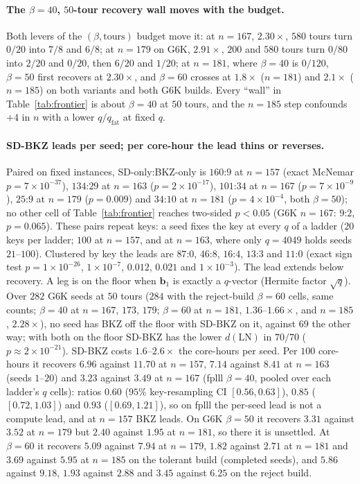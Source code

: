 \documentclass[journal=cic,version=preprint]{iacrj}
\begin{document}
\paragraph{The $\beta=40$, $50$-tour recovery wall moves with the budget.}
Both levers of the $(\beta,\text{tours})$ budget move it: at $n=167$,
$2.30\times$, $580$ tours turn $0/20$ into $7/8$ and $6/8$; at $n=179$ on
G6K, $2.91\times$, $200$ and $580$ tours turn $0/80$ into $2/20$ and $0/20$, then $6/20$ and $1/20$; at $n=181$,
where $\beta=40$ is $0/120$, $\beta=50$ first recovers at $2.30\times$, and
$\beta=60$ crosses at $1.8\times$ ($n=181$) and $2.1\times$ ($n=185$) on both variants and both G6K builds. Every ``wall'' in Table~\ref{tab:frontier} is about
$\beta=40$ at $50$ tours, and the $n=185$ step confounds $+4$ in $n$ with a
lower $q/q_\mathrm{fat}$ at fixed $q$.

\paragraph{SD-BKZ leads per seed; per core-hour the lead thins or reverses.}
Paired on fixed instances, SD-only:BKZ-only is $160$:$9$ at $n=157$ (exact
McNemar $p=7\times10^{-37}$), $134$:$29$ at $n=163$ ($p=2\times10^{-17}$),
$101$:$34$ at $n=167$ ($p=7\times10^{-9}$),
$25$:$9$ at $n=179$ ($p=0.009$) and $34$:$10$ at $n=181$
($p=4\times10^{-4}$, both $\beta=50$); no other cell of
Table~\ref{tab:frontier} reaches two-sided $p<0.05$ (G6K $n=167$: $9$:$2$,
$p=0.065$). These pairs repeat keys: a seed fixes the key at every $q$ of a
ladder ($20$ keys per ladder; $100$ at $n=157$, and at $n=163$, where only $q=4049$ holds seeds
$21$--$100$). Clustered by key the leads are $87$:$0$, $46$:$8$, $16$:$4$,
$13$:$3$ and $11$:$0$ (exact sign test $p=1\times10^{-26}$, $1\times10^{-7}$,
$0.012$, $0.021$ and $1\times10^{-3}$). The lead extends below recovery. A leg is on the floor when
$\mathbf b_1$ is exactly a $q$-vector (Hermite factor $\sqrt q$). Over $282$
G6K seeds at $50$ tours ($284$ with the reject-build $\beta=60$ cells, same counts; $\beta=40$
at $n=167$, $173$, $179$; $\beta=60$ at $n=181$, $1.36$--$1.66\times$, and
$n=185$, $2.28\times$), no seed has BKZ off the floor with SD-BKZ on it,
against $69$ the other way; with both on the floor SD-BKZ has the lower
$d(\mathrm{LN})$ in $70/70$ ($p\approx2\times10^{-21}$). SD-BKZ costs
$1.6$--$2.6\times$ the core-hours per seed. Per $100$ core-hours it
recovers $6.96$ against $11.70$ at $n=157$, $7.14$ against $8.41$ at $n=163$
(seeds $1$--$20$) and $3.23$ against $3.49$ at $n=167$ (fplll $\beta=40$,
pooled over each ladder's $q$ cells): ratios $0.60$ ($95\%$ key-resampling
CI $[0.56,0.63]$), $0.85$ ($[0.72,1.03]$) and $0.93$ ($[0.69,1.21]$), so on
fplll the per-seed lead is not a compute lead, and at $n=157$ BKZ leads. On G6K $\beta=50$ it recovers $3.31$ against $3.52$ at $n=179$ but
$2.40$ against $1.95$ at $n=181$, so there it is unsettled. At $\beta=60$
it recovers $5.09$ against $7.94$ at $n=179$, $1.82$ against $2.71$ at
$n=181$ and $3.69$ against $5.95$ at $n=185$ on the tolerant build (completed
seeds), and $5.86$ against $9.18$, $1.93$ against $2.88$ and $3.45$ against
$6.25$ on the reject build.
\end{document}
